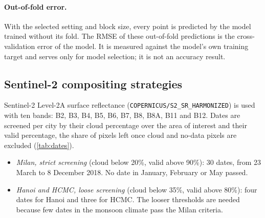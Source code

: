 \paragraph{Out-of-fold error.} With the selected setting and block size,
every point is predicted by the model trained without its fold. The RMSE of
these out-of-fold predictions is the cross-validation error of the model.
It is measured against the model's own training target and serves only for
model selection; it is not an accuracy result.

\subsection{Sentinel-2 compositing strategies}
\label{sec:compositing}

Sentinel-2 Level-2A surface reflectance \cite{esa2018s2,drusch2012sentinel2}
(\texttt{COPERNICUS/S2\_SR\_HARMONIZED}) is used with ten bands: B2, B3, B4,
B5, B6, B7, B8, B8A, B11 and B12. Dates are screened per city by their cloud
percentage over the area of interest and their valid percentage, the share
of pixels left once cloud and no-data pixels are excluded
(\cref{tab:dates}).

\begin{itemize}
  \item \emph{Milan, strict screening} (cloud below 20\%, valid above 90\%):
  30 dates, from 23 March to 8 December 2018. No date in January, February or
  May passed.
  \item \emph{Hanoi and HCMC, loose screening} (cloud below 35\%, valid above
  80\%): four dates for Hanoi and three for HCMC. The looser thresholds are
  needed because few dates in the monsoon climate pass the Milan criteria.
\end{itemize}

